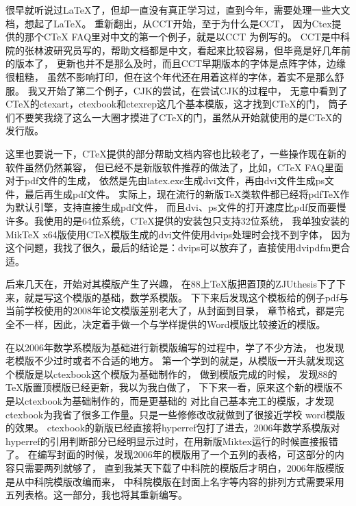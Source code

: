 \begin{preface}
很早就听说过\LaTeX\index{\LaTeX}了，但却一直没有真正学习过，直到今年，需要处理一些大文档，想起了\LaTeX。
重新翻出，从CCT开始，至于为什么是CCT，
因为Ctex提供的那个CTeX FAQ里对中文的第一个例子，就是以CCT
为例写的。
CCT是中科院的张林波研究员写的，帮助文档都是中文，看起来比较容易，但毕竟是好几年前的版本了，
更新也并不是那么及时，而且CCT早期版本的字体是点阵字体，边缘很粗糙，
虽然不影响打印，但在这个年代还在用着这样的字体，着实不是那么舒服。
我又开始了第二个例子，CJK的尝试，在尝试CJK的过程中，
无意中看到了CTeX的ctexart，ctexbook和ctexrep这几个基本模版，这才找到CTeX的门，
筒子们不要笑我绕了这么一大圈才摸进了CTeX的门，虽然从开始就使用的是CTeX的发行版。

这里也要说一下，CTeX提供的部分帮助文档内容也比较老了，一些操作现在新的软件虽然仍然兼容，
但已经不是新版软件推荐的做法了，比如，CTeX FAQ里面对于pdf文件的生成，
依然是先由latex.exe生成dvi文件，再由dvi文件生成ps文件，最后再生成pdf文件。
实际上，现在流行的新版TeX类软件都已经将pdfTeX作为默认引擎，支持直接生成pdf文件，
而且dvi、ps文件的打开速度比pdf反而要慢许多。我使用的是64位系统，CTeX提供的安装包只支持32位系统，
我单独安装的MikTeX x64版使用CTeX模版生成的dvi文件使用dvips处理时会找不到字体，
因为这个问题，我找了很久，最后的结论是：dvips可以放弃了，直接使用dvipdfm更合适。

后来几天在，开始对其模版产生了兴趣，
在88上TeX版把置顶的ZJUthesis下了下来，就是写这个模版的基础，数学系模版。
下下来后发现这个模板给的例子pdf与当前学校使用的2008年论文模版差别老大了，从封面到目录，
章节格式，都是完全不一样，因此，决定着手做一个与学样提供的Word模版比较接近的模版。

在以2006年数学系模版为基础进行新模版编写的过程中，学了不少方法，
也发现老模版不少过时或者不合适的地方。
第一个学到的就是，从模版一开头就发现这个模版是以ctexbook这个模版为基础制作的，
做到模版完成的时候，
发现88的TeX版置顶模版已经更新，我以为我白做了，
下下来一看，原来这个新的模版不是以ctexbook为基础制作的，而是更基础的\LaTeXe\index{\LaTeX}
对比自己基本完工的模版，才发现ctexbook为我省了很多工作量。只是一些修修改改就做到了很接近学校
word模版的效果。
ctexbook的新版已经直接将hyperref包打了进去，2006年数学系模版对hyperref的引用判断部分已经明显示过时，在用新版Miktex运行的时候直接报错了。
在编写封面的时候，发现2006年的模版用了一个五列的表格，可这部分的内容只需要两列就够了，
直到我某天下载了中科院的模版后才明白，2006年版模版是从中科院模版改编而来，
中科院模版在封面上名字等内容的排列方式需要采用五列表格。这一部分，我也将其重新编写。


\end{preface}
